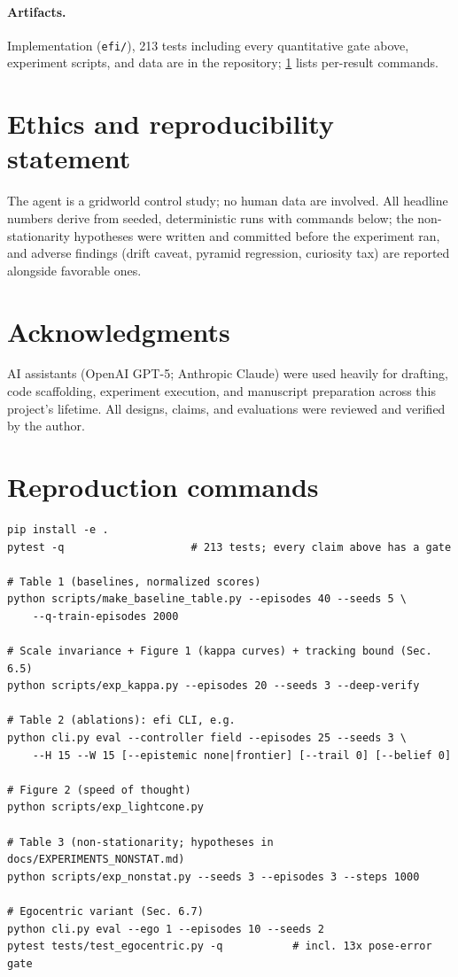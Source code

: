 \documentclass[11pt]{article}
\begin{document}
\paragraph{Artifacts.} Implementation (\texttt{efi/}), 213 tests including every quantitative gate above, experiment scripts, and data are in the repository; \cref{sec:repro} lists per-result commands.

\section*{Ethics and reproducibility statement}
The agent is a gridworld control study; no human data are involved. All headline numbers derive from seeded, deterministic runs with commands below; the non-stationarity hypotheses were written and committed before the experiment ran, and adverse findings (drift caveat, pyramid regression, curiosity tax) are reported alongside favorable ones.

\section*{Acknowledgments}
AI assistants (OpenAI GPT-5; Anthropic Claude) were used heavily for drafting, code scaffolding, experiment execution, and manuscript preparation across this project's lifetime. All designs, claims, and evaluations were reviewed and verified by the author.

\appendix
\section{Reproduction commands}
\label{sec:repro}
\begin{small}
\begin{verbatim}
pip install -e .
pytest -q                    # 213 tests; every claim above has a gate

# Table 1 (baselines, normalized scores)
python scripts/make_baseline_table.py --episodes 40 --seeds 5 \
    --q-train-episodes 2000

# Scale invariance + Figure 1 (kappa curves) + tracking bound (Sec. 6.5)
python scripts/exp_kappa.py --episodes 20 --seeds 3 --deep-verify

# Table 2 (ablations): efi CLI, e.g.
python cli.py eval --controller field --episodes 25 --seeds 3 \
    --H 15 --W 15 [--epistemic none|frontier] [--trail 0] [--belief 0]

# Figure 2 (speed of thought)
python scripts/exp_lightcone.py

# Table 3 (non-stationarity; hypotheses in docs/EXPERIMENTS_NONSTAT.md)
python scripts/exp_nonstat.py --seeds 3 --episodes 3 --steps 1000

# Egocentric variant (Sec. 6.7)
python cli.py eval --ego 1 --episodes 10 --seeds 2
pytest tests/test_egocentric.py -q           # incl. 13x pose-error gate
\end{verbatim}
\end{small}
\end{document}
